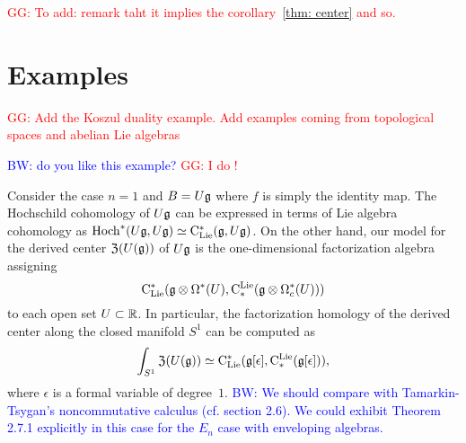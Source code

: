 \documentclass[11pt]{amsart}
\numberwithin{equation}{section}
\def\brian{\textcolor{blue}{BW: }\textcolor{blue}}
\def\greg{\textcolor{red}{GG: }\textcolor{red}}
\begin{document}
\greg{To add: remark taht it implies the corollary~\ref{thm: center} and so.}

\section{Examples}


\greg{Add the Koszul duality example. Add examples coming from topological spaces and abelian Lie algebras}

\brian{do you like this example?} \greg{I do !}
\begin{eg}\label{eg: TT}
Consider the case $n=1$ and $B = U \mathfrak g$ where $f$ is simply the identity map. 
The Hochschild cohomology of $U \mathfrak g$ can be expressed in terms of Lie algebra cohomology as ${\rm Hoch}^*(U\mathfrak g,U\mathfrak g) \simeq {\rm C}_{\rm Lie}^*(\mathfrak g, U\mathfrak g)$. 
On the other hand, our model for the derived center ${\frak Z}(U(\mathfrak g))$ of $U \mathfrak g$ is the one-dimensional factorization algebra assigning 
\[
{\rm C}_{\rm Lie}^*(\mathfrak g \otimes \Omega^*(U), {\rm C}^{\rm Lie}_*( \mathfrak g \otimes \Omega^*_c(U)))
\]
to each open set $U \subset \mathbb R$.
In particular, the factorization homology of the derived center along the closed manifold $S^1$ can be computed as
\[
\int_{S^1} {\frak Z}(U(\mathfrak g)) \simeq {\rm C}_{\rm Lie}^*(\mathfrak g[\epsilon], {\rm C}^{\rm Lie}_*( \mathfrak g[\epsilon])),
\]
where $\epsilon$ is a formal variable of degree~$1$. 
\brian{We should compare with Tamarkin-Tsygan's noncommutative calculus (cf. section 2.6).
We could exhibit Theorem 2.7.1 explicitly in this case for the $E_n$ case with enveloping algebras.}
\end{eg}

%



  


%  
\end{document}
